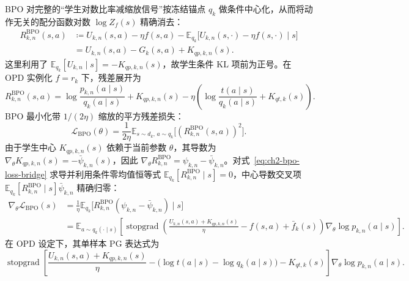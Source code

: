 \documentclass[lang=cn,scheme=chinese,openany]{elegantbook}
\newcommand{\sg}{\operatorname{stopgrad}}
\begin{document}
BPO 对完整的“学生对数比率减缩放信号”按冻结锚点 $q_k$ 做条件中心化，从而将动作无关的配分函数对数 $\log Z_f(s)$ 精确消去：
\begin{align}
R_{k,n}^{\mathrm{BPO}}(s,a)
&\coloneqq U_{k,n}(s,a)-\eta f(s,a)
-\mathbb E_{ q_k}\bigl[U_{k,n}(s,\cdot)-\eta f(s,\cdot)\mid s\bigr]
\label{eq:ch2-bpo-from-optimality}\\
&=U_{k,n}(s,a)-G_k(s,a)+K_{qp,k,n}(s).
\label{eq:ch2-bpo-expanded,eq:ch2-bpo-residual}
\end{align}
这里利用了 $\mathbb E_{q_k}[U_{k,n}\mid s]=-K_{qp,k,n}(s)$，故学生条件 KL 项前为正号。在 OPD 实例化 $f=r_k$ 下，残差展开为
\begin{equation}
R_{k,n}^{\mathrm{BPO}}(s,a)
=\log\frac{ p_{k,n}(a\mid s)}{ q_k(a\mid s)}+K_{qp,k,n}(s)
-\eta\left(\log\frac{ t(a\mid s)}{ q_k(a\mid s)}+K_{qt,k}(s)\right).
\label{eq:ch2-bpo-opd-expanded}
\end{equation}
BPO 最小化带 $1/(2\eta)$ 缩放的平方残差损失：
\begin{equation}
\mathcal L_{\mathrm{BPO}}(\theta)
=\frac1{2\eta}\mathbb E_{s\sim d_k,\, a\sim q_k}\bigl[(R_{k,n}^{\mathrm{BPO}}(s,a))^2\bigr].
\label{eq:ch2-bpo-loss-bridge}
\end{equation}
由于学生中心 $K_{qp,k,n}(s)$ 依赖于当前参数 $\theta$，其导数为 $\nabla_\theta K_{qp,k,n}(s)=-\bar\psi_{k,n}(s)$，因此 $\nabla_\theta R_{k,n}^{\mathrm{BPO}}=\psi_{k,n}-\bar\psi_{k,n}$。对式~\eqref{eq:ch2-bpo-loss-bridge} 求导并利用条件零均值恒等式 $\mathbb E_{q_k}[R_{k,n}^{\mathrm{BPO}}\mid s]=0$，中心导数交叉项 $\mathbb E_{q_k}[R_{k,n}^{\mathrm{BPO}}\mid s]\bar\psi_{k,n}$ 精确归零：
\begin{align}
\nabla_\theta\mathcal L_{\mathrm{BPO}}(s)
&=\frac1\eta\mathbb E_{q_k}\bigl[R_{k,n}^{\mathrm{BPO}}(\psi_{k,n}-\bar\psi_{k,n})\mid s\bigr]
\label{eq:ch2-bpo-gradient-bridge,eq:ch2-bpo-gradient}\\
&=\mathbb E_{a\sim q_k(\cdot\mid s)}\left[
\sg\!\left(\frac{U_{k,n}(s,a)+K_{qp,k,n}(s)}\eta-f(s,a)+\bar f_k(s)\right)\nabla_\theta\log p_{k,n}(a\mid s)\right].
\label{eq:ch2-bpo-pg}
\end{align}
在 OPD 设定下，其单样本 PG 表达式为
\begin{equation}
\label{eq:ch2-bpo-opd-pg}
\sg\!\left[
\frac{U_{k,n}(s,a)+K_{qp,k,n}(s)}{\eta}
-\bigl(\log t(a\mid s)-\log q_k(a\mid s)\bigr)
-K_{qt,k}(s)
\right]\nabla_\theta\log p_{k,n}(a\mid s).
\end{equation}
\end{document}
